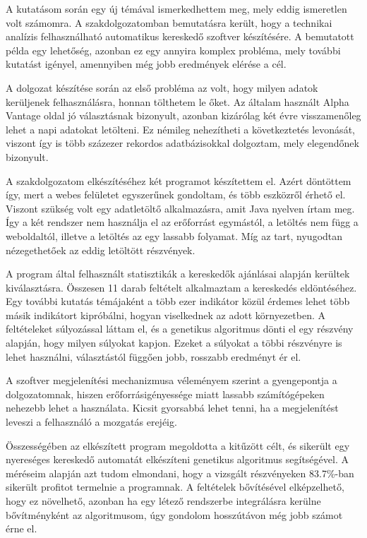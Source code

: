 A kutatásom során egy új témával ismerkedhettem meg, mely eddig ismeretlen volt számomra. A szakdolgozatomban bemutatásra került, hogy a technikai analízis felhasználható automatikus kereskedő szoftver készítésére. A bemutatott példa egy lehetőség, azonban ez egy annyira komplex probléma, mely további kutatást igényel, amennyiben még jobb eredmények elérése a cél.

A dolgozat készítése során az első probléma az volt, hogy milyen adatok kerüljenek felhasználásra, honnan tölthetem le őket. Az általam használt Alpha Vantage oldal jó választásnak bizonyult, azonban kizárólag két évre visszamenőleg lehet a napi adatokat letölteni. Ez némileg nehezítheti a következtetés levonását, viszont így is több százezer rekordos adatbázisokkal dolgoztam, mely elegendőnek bizonyult.

A szakdolgozatom elkészítéséhez két programot készítettem el. Azért döntöttem így, mert a webes felületet egyszerűnek gondoltam, és több eszközről érhető el. Viszont szükség volt egy adatletöltő alkalmazásra, amit Java nyelven írtam meg. Így a két rendszer nem használja el az erőforrást egymástól, a letöltés nem függ a weboldaltól, illetve a letöltés az egy lassabb folyamat. Míg az tart, nyugodtan nézegethetőek az eddig letöltött részvények.

A program által felhasznált statisztikák a kereskedők ajánlásai alapján kerültek kiválasztásra. Összesen 11 darab feltételt alkalmaztam a kereskedés eldöntéséhez. Egy további kutatás témájaként a több ezer indikátor közül érdemes lehet több másik indikátort kipróbálni, hogyan viselkednek az adott környezetben. A feltételeket súlyozással láttam el, és a genetikus algoritmus dönti el egy részvény alapján, hogy milyen súlyokat kapjon. Ezeket a súlyokat a többi részvényre is lehet használni, választástól függően jobb, rosszabb eredményt ér el.

A szoftver megjelenítési mechanizmusa véleményem szerint a gyengepontja a dolgozatomnak, hiszen erőforrásigényessége miatt lassabb számítógépeken nehezebb lehet a használata. Kicsit gyorsabbá lehet tenni, ha a megjelenítést leveszi a felhasználó a mozgatás erejéig.

Összességében az elkészített program megoldotta a kitűzött célt, és sikerült egy nyereséges kereskedő automatát elkészíteni genetikus algoritmus segítségével. A méréseim alapján azt tudom elmondani, hogy a vizsgált részvényeken 83.7\%-ban sikerült profitot termelnie a programnak. A feltételek bővítésével elképzelhető, hogy ez növelhető, azonban ha egy létező rendszerbe integrálásra kerülne bővítményként az algoritmusom, úgy gondolom hosszútávon még jobb számot érne el. 